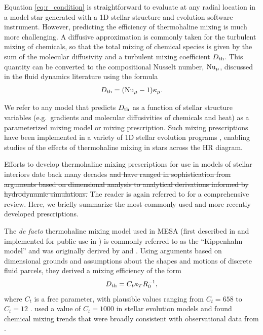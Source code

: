%
Equation \eqref{eq:r_condition} is straightforward to evaluate at any radial location in a model star generated with a 1D stellar structure and evolution software instrument. 
However, predicting the efficiency of thermohaline mixing is much more challenging. 
A diffusive approximation is commonly taken for the turbulent mixing of chemicals, so that the total mixing of chemical species is given by the sum of the molecular diffusivity and a turbulent mixing coefficient $D_\mathrm{th}$. 
This quantity can be converted to the compositional Nusselt number, $\mathrm{Nu}_\mu$, discussed in the fluid dynamics literature using the formula
\begin{equation} \label{eq:Dth_from_Nu}
    \Dth = (\Numu - 1)\kappa_\mu.
\end{equation}

We refer to any model that predicts $D_\mathrm{th}$ as a function of stellar structure variables (e.g.~gradients and molecular diffusivities of chemicals and heat) as a parameterized mixing model or mixing prescription. 
Such mixing prescriptions have been implemented in a variety of 1D stellar evolution programs \citep[see][and references therein]{lattanzio_etal_2015}, enabling studies of the effects of thermohaline mixing in stars across the HR diagram.

Efforts to develop thermohaline mixing prescriptions for use in models of stellar interiors date back many decades \sout{and have ranged in sophistication from arguments based on dimensional analysis to analytical derivations informed by hydrodynamic simulations.} 
The reader is again referred to \citet{garaud_DDC_review_2018} for a comprehensive review. Here, we briefly summarize the most commonly used and more recently developed prescriptions.


The \textit{de facto} thermohaline mixing model used in MESA (first described in \citealt{CantielloLanger2010} and implemented for public use in \citealt{mesa2}) is commonly referred to as the ``Kippenhahn model'' and was originally derived by \citet{Ulrich1972} and \citet{kippenhahn_etal_1980}.
Using arguments based on dimensional grounds and assumptions about the shapes and motions of discrete fluid parcels, they derived a mixing efficiency of the form
\begin{equation} \label{eq:Dth-kipp}
    \Dth = C_t \kappa_T R_0^{-1},
\end{equation}
\citep[see Eq.~(5) of][]{charbonnel_thermohaline_2007}
where $C_t$ is a free parameter, with plausible values ranging from $C_t = 658$ \citep{Ulrich1972} to $C_t = 12$ \citep{kippenhahn_etal_1980}. 
\citet{charbonnel_thermohaline_2007} used a value of $C_t = 1000$ in stellar evolution models and found chemical mixing trends that were broadly consistent with observational data from \citet{Gratton2000}.

